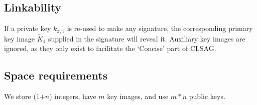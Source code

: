 \subsection*{Linkability}

If a private key \(k_{\pi, 1}\) is re-used to make any signature, the corresponding primary key image \(\tilde{K}_1\) supplied in the signature will reveal it. Auxiliary key images are ignored, as they only exist to facilitate the `Concise' part of CLSAG.


\subsection*{Space requirements}

We store (1+$n$) integers, have $m$ key images, and use $m*n$ public keys.

